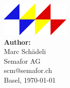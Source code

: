 \begin{titlepage}
\sffamily
\centering
\includegraphics{images/logo.png}
\vfill
{\bfseries{\thetitle}}\\
\vfill
\textbf{Author:}\\[1ex]
Marc Schädeli \\
Semafor AG \\
scm@semafor.ch \\
\vfill
\small
Basel, \today \\[2cm]
\end{titlepage}

